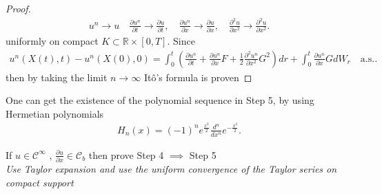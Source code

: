 \begin{proof}
  \begin{align*}
    u^{n} \to  u \quad \frac{\partial u^{n } }{\partial t} \to \frac{\partial u}{\partial t} , \quad \frac{\partial u^{n } }{\partial x} \to \frac{\partial u}{\partial x} , \quad \frac{\partial ^2 u}{\partial x^2} \to \frac{\partial ^2 u}{\partial x^2} 
  .\end{align*}
  uniformly on compact $K \subset  \mathbb{R}\times [0,T]$. Since 
  \begin{align*}
    u^{n}(X(t),t) -u^{n}(X(0),0)  = \int_0^{t} \left( \frac{\partial u^{n } }{\partial t} +\frac{\partial u^{n } }{\partial x} F + \frac{1}{2} \frac{\partial ^2 u^{n} }{\partial x^2} G^2  \right)  dr + \int_0^{t} \frac{\partial u^{n } }{\partial x}  GdW_r \quad \text{a.s.} 
  .\end{align*}
  then by taking the limit $n\to \infty$ It\^o's formula is proven 
\end{proof}
\begin{remark}
 One can get the existence of the polynomial sequence in Step 5, by using Hermetian polynomials 
 \begin{align*}
  H_n(x) = (-1)^{n}  e^{\frac{x^2}{2}} \frac{d^{n}}{d x^{n} } e^{-\frac{x^2}{2}} 
 .\end{align*}
\end{remark}
\begin{exercise}
  If $u \in  \mathcal{C}^{\infty} $  , $\frac{\partial u}{\partial x} \in  \mathcal{C}_b$ then prove Step 4 $\implies$ Step 5 \\[1ex]
  \textit{Use Taylor expansion and use the uniform convergence of the Taylor series on compact support }
\end{exercise}
\newpage
